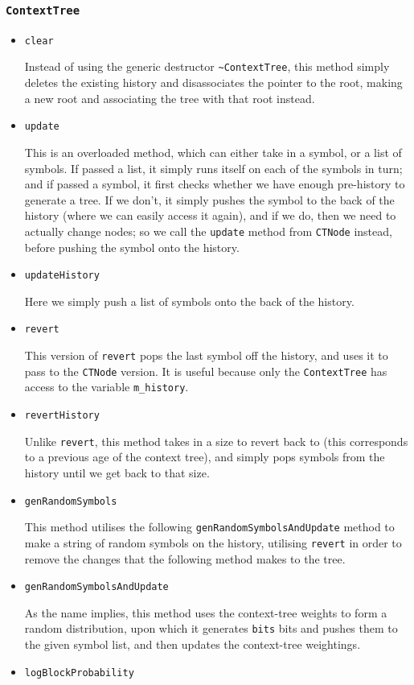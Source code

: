 \documentclass[pdftex,twoside,a4paper]{report}
\begin{document}
\subsubsection{\texttt{ContextTree}}
\begin{itemize}
\item{\texttt{clear}
    
    Instead of using the generic destructor \texttt{\~{}ContextTree}, this method simply deletes the existing history and disassociates the pointer to the root, making a new root and associating the tree with that root instead.
  }
\item{\texttt{update}

    This is an overloaded method, which can either take in a symbol, or a list of symbols. If passed a list, it simply runs itself on each of the symbols in turn; and if passed a symbol, it first checks whether we have enough pre-history to generate a tree. If we don't, it simply pushes the symbol to the back of the history (where we can easily access it again), and if we do, then we need to actually change nodes; so we call the \texttt{update} method from \texttt{CTNode} instead, before pushing the symbol onto the history.
  }
\item{\texttt{updateHistory}
    
    Here we simply push a list of symbols onto the back of the history.
  }
\item{\texttt{revert}
    
    This version of \texttt{revert} pops the last symbol off the history, and uses it to pass to the \texttt{CTNode} version. It is useful because only the \texttt{ContextTree} has access to the variable \texttt{m\_history}.
  }
\item{\texttt{revertHistory}
    
    Unlike \texttt{revert}, this method takes in a size to revert back to (this corresponds to a previous age of the context tree), and simply pops symbols from the history until we get back to that size. 
  }
\item{\texttt{genRandomSymbols}
    
    This method utilises the following \texttt{genRandomSymbolsAndUpdate} method to make a string of random symbols on the history, utilising \texttt{revert} in order to remove the changes that the following method makes to the tree.
  }
\item{\texttt{genRandomSymbolsAndUpdate}
    
    As the name implies, this method uses the context-tree weights to form a random distribution, upon which it generates \texttt{bits} bits and pushes them to the given symbol list, and then updates the context-tree weightings.
  }
\item{\texttt{logBlockProbability}
    
}
\end{itemize}
\end{document}
